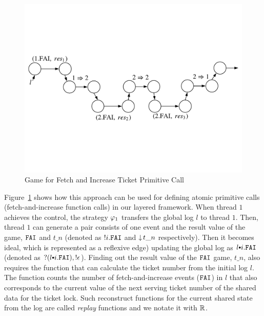 \begin{figure}

\begin{center}
\includegraphics[scale=.8]{figs/ccal/faiexample}
\end{center}%
\caption{Game for Fetch and Increase Ticket Primitive Call}
\label{fig:chapter:ccal:game-for-fetch-and-increase-ticket-primitive-call}
\end{figure}


Figure~\ref{fig:chapter:ccal:game-for-fetch-and-increase-ticket-primitive-call} shows how 
this approach can be used for defining  atomic primitive calls (fetch-and-increase function calls) in our layered framework.
When thread $1$ achieves the control, the strategy  $\varphi_{1}$ transfers the global log $l$  to thread $1$. 
Then, thread $1$ can generate a pair consists of one event and the result value of the game, 
${\mathrm{\texttt{FAI}}}$ and $t\_n$ (denoted as $!i.{\mathrm{\texttt{FAI}}}$ and $\downarrow\! t\_n$ respectively). 
Then it becomes ideal, which is represented as a reflexive edge) updating the global log as $l \cons i.\incticket$ (denoted as $?(l \cons i.\incticket),!\epsilon$).
Finding out the result value of the ${\mathrm{\texttt{FAI}}}$ game, $t\_n$, 
also requires the function that can calculate the ticket number from the initial log $l$.
The function counts the number of fetch-and-increase events (${\mathrm{\texttt{FAI}}}$) in $l$ that
also corresponds to the current value of the next serving ticket number of the shared data for the ticket lock.
Such reconstruct functions for the current shared state from the log are called \emph{replay} functions and we notate it with $\mathbb{R}$.

